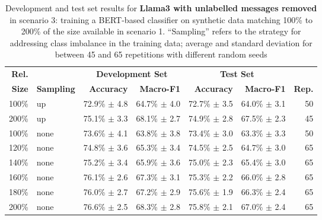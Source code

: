 
\begin{table*}[ht]
\centering
\begin{tabular}{rlrrrrr}
\textbf{Rel.}  &  &
\multicolumn{2}{c}{\textbf{Development Set}} &
\multicolumn{2}{c}{\textbf{Test Set}} \\
\textbf{Size}  & \textbf{Sampling}  &
\textbf{Accuracy} & \textbf{Macro-F1}  &
\textbf{Accuracy} & \textbf{Macro-F1}  &
\textbf{Rep.}  \\
\hline
100\%  & up  &   72.9\% $\pm$    4.8  &   64.7\% $\pm$    4.0  &   72.7\% $\pm$    3.5  &   64.0\% $\pm$    3.1  & 50  \\
200\%  & up  &   75.1\% $\pm$    3.3  &   68.1\% $\pm$    2.7  &   74.9\% $\pm$    2.8  &   67.5\% $\pm$    2.3  & 45  \\
\hline
100\%  & none  &   73.6\% $\pm$    4.1  &   63.8\% $\pm$    3.8  &   73.4\% $\pm$    3.0  &   63.3\% $\pm$    3.3  & 50  \\
120\%  & none  &   74.8\% $\pm$    3.6  &   65.3\% $\pm$    3.4  &   74.5\% $\pm$    2.5  &   64.7\% $\pm$    3.0  & 65  \\
140\%  & none  &   75.2\% $\pm$    3.4  &   65.9\% $\pm$    3.6  &   75.0\% $\pm$    2.3  &   65.4\% $\pm$    3.0  & 65  \\
160\%  & none  &   76.1\% $\pm$    2.6  &   67.3\% $\pm$    3.1  &   75.3\% $\pm$    2.2  &   66.0\% $\pm$    2.8  & 65  \\
180\%  & none  &   76.0\% $\pm$    2.7  &   67.2\% $\pm$    2.9  &   75.6\% $\pm$    1.9  &   66.3\% $\pm$    2.4  & 65  \\
200\%  & none  &   76.6\% $\pm$    2.5  &   68.3\% $\pm$    2.8  &   75.8\% $\pm$    2.1  &   67.0\% $\pm$    2.4  & 65  \\
\hline
\end{tabular}
\caption{Development and test set results for \textbf{Llama3 with unlabelled messages removed} in scenario 3:
    training a BERT-based classifier on synthetic data matching
    100\% to 200\% of the size available in scenario 1.
    ``Sampling'' refers to the strategy for addressing class
    imbalance in the training data; average and standard deviation for between 45 and 65 repetitions with different random seeds}
\label{t:results-s4-s1v1}
\end{table*}
